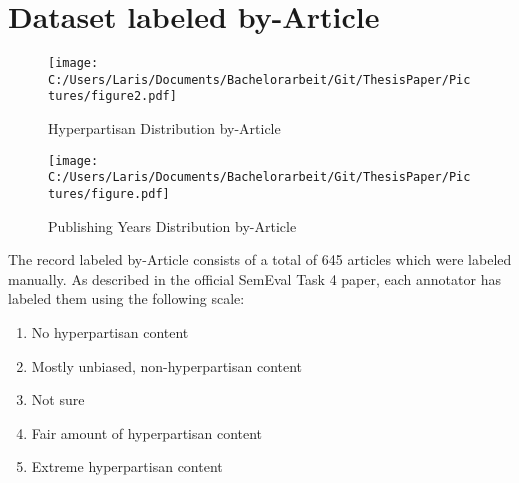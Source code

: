 \documentclass[a4paper, 11pt,titlepage,oneside,openany]{book}
\begin{document}

\newpage
\section{Dataset labeled by-Article}
\begin{figure}[h]
	\begin{minipage}{.45\linewidth}
		\texttt{[image: C:/Users/Laris/Documents/Bachelorarbeit/Git/ThesisPaper/Pictures/figure2.pdf]}
		\caption{Hyperpartisan Distribution by-Article}
	\end{minipage}
	\hspace{.1\linewidth}%
	\begin{minipage}{.45\linewidth}
		\texttt{[image: C:/Users/Laris/Documents/Bachelorarbeit/Git/ThesisPaper/Pictures/figure.pdf]}
		\caption{Publishing Years Distribution by-Article}
	\end{minipage}
\end{figure}
\noindent The record labeled by-Article consists of a total of 645 articles which were labeled manually. As described in the official SemEval Task 4 paper, each annotator has labeled them using the following scale:
\begin{enumerate}
	\item No hyperpartisan content
	\item Mostly unbiased, non-hyperpartisan content
	\item Not sure
	\item Fair amount of hyperpartisan content
	\item Extreme hyperpartisan content
\end{enumerate}
\end{document}
